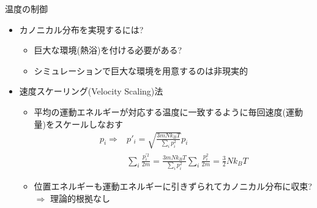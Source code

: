 
\begin{frame}[t,fragile]{温度の制御}
  \begin{itemize}
  \item カノニカル分布を実現するには?
    \begin{itemize}
    \item 巨大な環境(熱浴)を付ける必要がある?
    \item シミュレーションで巨大な環境を用意するのは非現実的
    \end{itemize}
  \item 速度スケーリング(Velocity Scaling)法
    \begin{itemize}
    \item 平均の運動エネルギーが対応する温度に一致するように毎回速度(運動量)をスケールしなおす
      \begin{align*}
        p_i \Rightarrow &p'_i = \sqrt{ \frac{3mNk_BT}{\sum_i p_i^2} } p_i \\
        & \sum_i \frac{p_i^{'2}}{2m} = \frac{3mNk_BT}{\sum_i p_i^2} \sum_i \frac{p_i^2}{2m} = \frac{3}{2} N k_B T
      \end{align*}
    \item 位置エネルギーも運動エネルギーに引きずられてカノニカル分布に収束? $\Rightarrow$ 理論的根拠なし
    \end{itemize}
  \end{itemize}
\end{frame}
